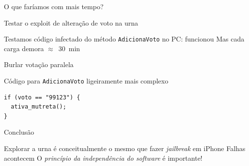 \documentclass[14pt]{beamer}
\begin{document}
\begin{frame}[fragile]{O que faríamos com mais tempo?}
  \begin{fullpageitemize}
    \itemR Testar o exploit de alteração de voto na urna
    \begin{itemize}
      \itemR Testamos código infectado do método \texttt{AdicionaVoto} no PC: funcionou
      \itemR Mas cada carga demora $\approx$~30~min
    \end{itemize}
    \itemR Burlar votação paralela
    \begin{itemize}
      \itemR Código para \texttt{AdicionaVoto} ligeiramente mais complexo
      \begin{verbatim}
if (voto == "99123") {
  ativa_mutreta();
}
      \end{verbatim}
    \end{itemize}
  \end{fullpageitemize}
\end{frame}

\begin{frame}{Conclusão}
  \begin{fullpageitemize}
    \itemR Explorar a urna é conceitualmente o mesmo que fazer \textit{jailbreak} em iPhone
    \itemR Falhas acontecem
    \itemR O \textit{princípio da independência do software} é importante!
  \end{fullpageitemize}
\end{frame}

\end{document}
